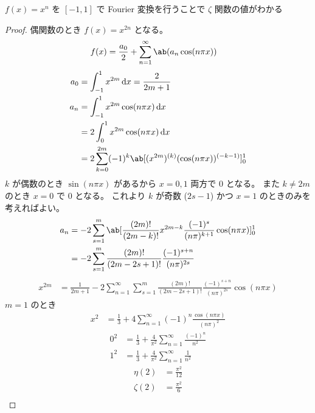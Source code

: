 \documentclass[uplatex,dvipdfmx,a4paper,11pt]{jlreq}
\begin{document}
\begin{theorem}
  $f(x) = x^n$ を $[-1, 1]$ で Fourier 変換を行うことで $\zeta$ 関数の値がわかる
\end{theorem}
\begin{proof}
  偶関数のとき $f(x) = x^{2n}$ となる。
  \begin{align}
    f(x) & = \frac{a_0}{2} + \sum_{n=1}^{\infty}\ab(a_n\cos(n\pi x))
  \end{align}
  \begin{align}
    a_0 & = \int_{-1}^{1}x^{2m}\dl{x} = \frac{2}{2m+1}                               \\
    a_n & = \int_{-1}^{1}x^{2m}\cos(n\pi x)\dl{x}                                    \\
        & = 2\int_{0}^{1}x^{2m}\cos(n\pi x)\dl{x}                                    \\
        & = 2\sum_{k=0}^{2m}(-1)^k\ab[(x^{2m})^{(k)}(\cos(n\pi x))^{(-k-1)}]_{0}^{1}
  \end{align}
  $k$ が偶数のとき $\sin(n\pi x)$ があるから $x = 0, 1$ 両方で $0$ となる。
  また $k \neq 2m$ のとき $x = 0$ で $0$ となる。
  これより $k$ が奇数 ($2s - 1$) かつ $x = 1$ のときのみを考えればよい。
  \begin{align}
    a_n & = -2\sum_{s=1}^{m}\ab[\frac{(2m)!}{(2m - k)!}x^{2m-k}\frac{(-1)^s}{(n\pi)^{k+1}}\cos(n\pi x)]_0^1 \\
        & = -2\sum_{s=1}^{m}\frac{(2m)!}{(2m - 2s + 1)!}\frac{(-1)^{s + n}}{(n\pi)^{2s}}
  \end{align}
  \begin{align}
    x^{2m} & = \frac{1}{2m+1} - 2\sum_{n=1}^{\infty}\sum_{s=1}^{m}\frac{(2m)!}{(2m - 2s + 1)!}\frac{(-1)^{s + n}}{(n\pi)^{2s}}\cos(n\pi x)
  \end{align}
  $m = 1$ のとき
  \begin{align}
    x^2 & = \frac{1}{3} + 4\sum_{n=1}^{\infty}(-1)^{n}\frac{\cos(n\pi x)}{(n\pi)^{2}}
  \end{align}
  \begin{align}
    0^2 & = \frac{1}{3} + \frac{4}{\pi^2}\sum_{n=1}^{\infty}\frac{(-1)^{n}}{n^2} \\
    1^2 & = \frac{1}{3} + \frac{4}{\pi^2}\sum_{n=1}^{\infty}\frac{1}{n^2}
  \end{align}
  \begin{align}
    \eta(2)  & = \frac{\pi^2}{12} \\
    \zeta(2) & = \frac{\pi^2}{6}
  \end{align}
  \begin{align}

\end{align}
\end{proof}
\end{document}
